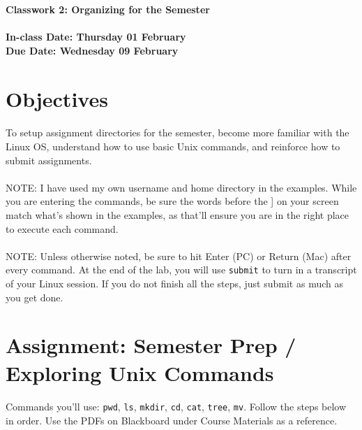 \documentclass[letter,11pt]{article}
\begin{document}
\huge
\textbf{Classwork 2: Organizing for the Semester}
\normalsize
\\ ~~ \\
\textbf{In-class Date: Thursday 01 February} \\
\textbf{Due Date: Wednesday 09 February}

\section*{Objectives}
\paragraph{}To setup assignment directories for the semester, become more familiar with the Linux OS, understand how to use basic Unix commands, and reinforce how to submit assignments.
\paragraph{}NOTE: I have used my own username and home directory in the examples. While you are entering the commands, be sure the words before the ] on your screen match what’s shown in the examples, as that’ll ensure you are in the right place to execute each command.
\paragraph{}NOTE: Unless otherwise noted, be sure to hit Enter (PC) or Return (Mac) after every command. At the end of the lab, you will use \texttt{submit} to turn in a transcript of your Linux session. If you do not finish all the steps, just submit as much as you get done.

\section*{Assignment: Semester Prep / Exploring Unix Commands}
\paragraph{}Commands you'll use: \texttt{pwd}, \texttt{ls}, \texttt{mkdir}, \texttt{cd}, \texttt{cat}, \texttt{tree}, \texttt{mv}. Follow the steps below in order. Use the PDFs on Blackboard under Course Materials as a reference.
\end{document}
